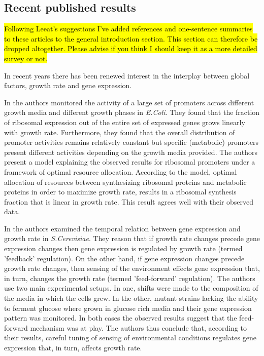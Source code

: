 \documentclass[a4page,notitlepage]{article}
\begin{document}
\subsection{Recent published results}
\hl{Following Leeat's suggestions I've added references and one-sentence summaries to these articles to the general introduction section. This section can therefore be dropped altogether. Please advise if you think I should keep it as a more detailed survey or not.}

In recent years there has been renewed interest in the interplay between global factors, growth rate and gene expression.

In \cite{Zaslaver2009a} the authors monitored the activity of a large set of promoters across different growth media and different growth phases in \emph{E.Coli}.
They found that the fraction of ribosomal expression out of the entire set of expressed genes grows linearly with growth rate.
Furthermore, they found that the overall distribution of promoter activities remains relatively constant but specific (metabolic) promoters present different activities depending on the growth media provided.
The authors present a model explaining the observed results for ribosomal promoters under a framework of optimal resource allocation.
According to the model, optimal allocation of resources between synthesizing ribosomal proteins and metabolic proteins in order to maximize growth rate, results in a ribosomal synthesis fraction that is linear in growth rate.
This result agrees well with their observed data.

In \cite{Levy2009} the authors examined the temporal relation between gene expression and growth rate in \emph{S.Cerevisiae}.
They reason that if growth rate changes precede gene expression changes then gene expression is regulated by growth rate (termed 'feedback' regulation).
On the other hand, if gene expression changes precede growth rate changes, then sensing of the environment effects gene expression that, in turn, changes the growth rate (termed 'feed-forward' regulation).
The authors use two main experimental setups.
In one, shifts were made to the composition of the media in which the cells grew.
In the other, mutant strains lacking the ability to ferment glucose where grown in glucose rich media and their gene expression pattern was monitored.
In both cases the observed results suggest that the feed-forward mechanism was at play.
The authors thus conclude that, according to their results, careful tuning of sensing of environmental conditions regulates gene expression that, in turn, affects growth rate.
\end{document}
